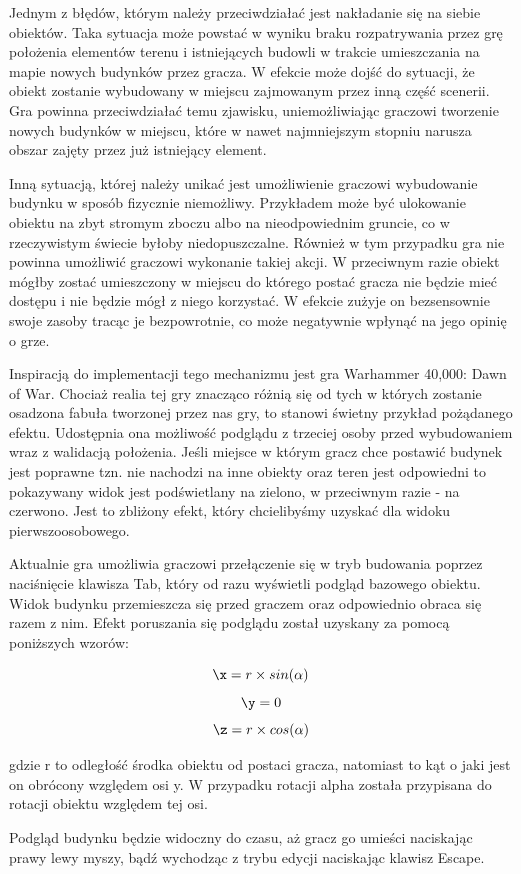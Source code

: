 Jednym z błędów, którym należy przeciwdziałać jest nakładanie się na siebie obiektów. Taka sytuacja może powstać w wyniku braku rozpatrywania przez grę położenia elementów terenu i istniejących budowli w trakcie umieszczania na mapie nowych budynków przez gracza. W efekcie może dojść do sytuacji, że obiekt zostanie wybudowany w miejscu zajmowanym przez inną część scenerii. Gra powinna przeciwdziałać temu zjawisku, uniemożliwiając graczowi tworzenie nowych budynków w miejscu, które w nawet najmniejszym stopniu narusza obszar zajęty przez już istniejący element.

Inną sytuacją, której należy unikać jest umożliwienie graczowi wybudowanie budynku w sposób fizycznie niemożliwy. Przykładem może być ulokowanie obiektu na zbyt stromym zboczu albo na nieodpowiednim gruncie, co w rzeczywistym świecie byłoby niedopuszczalne. Również w tym przypadku gra nie powinna umożliwić graczowi wykonanie takiej akcji. W przeciwnym razie obiekt mógłby zostać umieszczony w miejscu do którego postać gracza nie będzie mieć dostępu i nie będzie mógł z niego korzystać. W efekcie zużyje on bezsensownie swoje zasoby tracąc je bezpowrotnie, co może negatywnie wpłynąć na jego opinię o grze.

Inspiracją do implementacji tego mechanizmu jest gra Warhammer 40,000: Dawn of War. Chociaż realia tej gry znacząco różnią się od tych w których zostanie osadzona fabuła tworzonej przez nas gry, to stanowi świetny przykład pożądanego efektu. Udostępnia ona możliwość podglądu z trzeciej osoby przed wybudowaniem wraz z walidacją położenia. Jeśli miejsce w którym gracz chce postawić budynek jest poprawne tzn. nie nachodzi na inne obiekty oraz teren jest odpowiedni to pokazywany widok jest podświetlany na zielono, w przeciwnym razie - na czerwono. Jest to zbliżony efekt, który chcielibyśmy uzyskać dla widoku pierwszoosobowego.

Aktualnie gra umożliwia graczowi przełączenie się w tryb budowania poprzez naciśnięcie klawisza Tab, który od razu wyświetli podgląd bazowego obiektu. Widok budynku przemieszcza się przed graczem oraz odpowiednio obraca się razem z nim. Efekt poruszania się podglądu został uzyskany za pomocą poniższych wzorów:

$$ \x = r \times sin(\alpha) $$
$$ \y = 0 $$
$$ \z = r \times cos(\alpha) $$

gdzie r to odległość środka obiektu od postaci gracza, natomiast \alpha to kąt o jaki jest on obrócony względem osi y. W przypadku rotacji alpha została przypisana do rotacji obiektu względem tej osi.

Podgląd budynku będzie widoczny do czasu, aż gracz go umieści naciskając prawy lewy myszy, bądź wychodząc z trybu edycji naciskając klawisz Escape.
